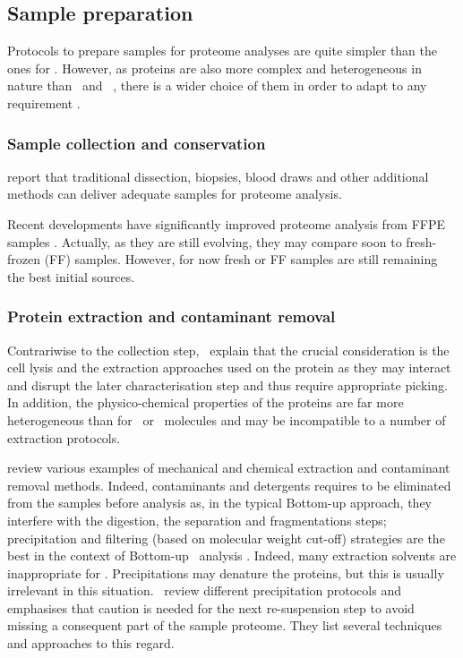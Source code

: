 \subsection{Sample preparation}
Protocols to prepare samples for proteome analyses are quite simpler than the
ones for \Rnaseq. However, as proteins are also more complex and heterogeneous in
nature than \DNA\ and \RNA\ , there is a wider choice of them
in order to adapt to any requirement .

\subsubsection{Sample collection and conservation}
\cite{Feist2015} report that traditional dissection, biopsies, blood draws and
other additional methods can deliver adequate samples for proteome analysis.

Recent developments have significantly improved proteome analysis from
\gls{FFPE} samples . Actually, as they are still evolving,
they may compare soon to fresh-frozen (\gls{FF}) samples.
However, for now fresh or \gls{FF} samples are still remaining the best initial
sources.

\subsubsection{Protein extraction and contaminant removal}
Contrariwise to the collection step,~\cite{Feist2015} explain that the crucial
consideration is the cell lysis and the extraction approaches used on
the protein as they may interact and disrupt the later characterisation step and
thus require appropriate picking. In addition, the physico-chemical properties of
the proteins are far more heterogeneous than for \DNA\ or \RNA\ molecules
 and may be incompatible to a number of extraction protocols.

\cite{Gutstein2008,Bodzon-Kulakowska2007,Visser2005,Hilbrig2003} review various
examples of mechanical and chemical extraction and contaminant removal methods.
Indeed, contaminants and detergents requires to be eliminated from the samples
before analysis as, in the typical \gls{Bottom-up} approach, they interfere
with the digestion, the separation and fragmentations steps; precipitation and
filtering (based on molecular weight cut-off) strategies are the best in the
context of \gls{Bottom-up} \ms\ analysis . Indeed, many
extraction solvents are inappropriate for \ms. Precipitations may denature the
proteins, but this is usually irrelevant in this situation.~\cite{Feist2015}
review different precipitation protocols and emphasises that caution is needed
for the next re-suspension step to avoid missing a consequent part of the
sample proteome. They list several techniques and approaches to this regard.

